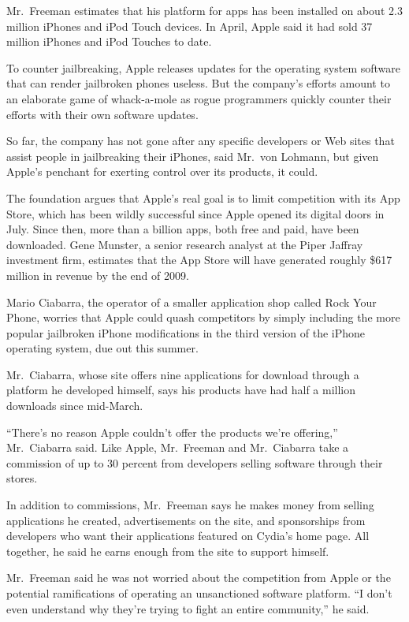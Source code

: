 \documentclass[12pt,a4paper,onecolumn]{article}
\begin{document}
Mr.~Freeman estimates that his platform for apps has been installed on about 2.3 million iPhones and
iPod Touch devices. In April, Apple said it had sold 37 million iPhones and iPod Touches to date.

To counter jailbreaking, Apple releases updates for the operating system software that can render
jailbroken phones useless. But the company's efforts amount to an elaborate game of whack-a-mole as
rogue programmers quickly counter their efforts with their own software updates.

So far, the company has not gone after any specific developers or Web sites that assist people in
jailbreaking their iPhones, said Mr.~von Lohmann, but given Apple's penchant for exerting control
over its products, it could.

The foundation argues that Apple's real goal is to limit competition with its App Store, which has
been wildly successful since Apple opened its digital doors in July. Since then, more than a billion
apps, both free and paid, have been downloaded. Gene Munster, a senior research analyst at the Piper
Jaffray investment firm, estimates that the App Store will have generated roughly \$617 million in
revenue by the end of 2009.

Mario Ciabarra, the operator of a smaller application shop called Rock Your Phone, worries that
Apple could quash competitors by simply including the more popular jailbroken iPhone modifications
in the third version of the iPhone operating system, due out this summer.

Mr.~Ciabarra, whose site offers nine applications for download through a platform he developed
himself, says his products have had half a million downloads since mid-March.

``There's no reason Apple couldn't offer the products we're offering,'' Mr.~Ciabarra said. Like
Apple, Mr.~Freeman and Mr.~Ciabarra take a commission of up to 30 percent from developers selling
software through their stores.

In addition to commissions, Mr.~Freeman says he makes money from selling applications he created,
advertisements on the site, and sponsorships from developers who want their applications featured on
Cydia's home page. All together, he said he earns enough from the site to support himself.

Mr.~Freeman said he was not worried about the competition from Apple or the potential ramifications
of operating an unsanctioned software platform. ``I don't even understand why they're trying to
fight an entire community,'' he said.
\end{document}
